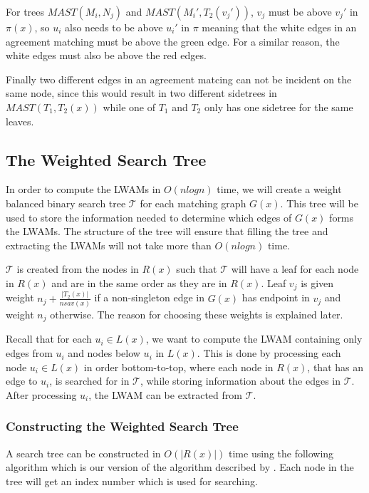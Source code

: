 For trees $MAST(M_i, N_j)$ and $MAST(M_i', T_2(v_j'))$, $v_j$ must be above $v_j'$ in $\pi(x)$, so $u_i$ also needs to be above $u_i'$ in $\pi$ meaning that the white edges in an agreement matching must be above the green edge. For a similar reason, the white edges must also be above the red edges.

Finally two different edges in an agreement matcing can not be incident on the same node, since this would result in two different sidetrees in $MAST(T_1, T_2(x))$ while one of $T_1$ and $T_2$ only has one sidetree for the same leaves.

\subsection{The Weighted Search Tree}
In order to compute the LWAMs in $O(nlogn)$ time, we will create a weight balanced binary search tree $\mathcal{T}$ for each matching graph $G(x)$. This tree will be used to store the information needed to determine which edges of $G(x)$ forms the LWAMs. The structure of the tree will ensure that filling the tree and extracting the LWAMs will not take more than $O(nlogn)$ time.

$\mathcal{T}$ is created from the nodes in $R(x)$ such that $\mathcal{T}$ will have a leaf for each node in $R(x)$ and are in the same order as they are in $R(x)$. Leaf $v_j$ is given weight $n_j + \frac{|T_2(x)|}{nsav(x)}$ if a non-singleton edge in $G(x)$ has endpoint in $v_j$ and weight $n_j$ otherwise. The reason for choosing these weights is explained later.

Recall that for each $u_i \in L(x)$, we want to compute the LWAM containing only edges from $u_i$ and nodes below $u_i$ in $L(x)$. This is done by processing each node $u_i \in L(x)$ in order bottom-to-top, where each node in $R(x)$, that has an edge to $u_i$, is searched for in $\mathcal{T}$, while storing information about the edges in $\mathcal{T}$.  After processing $u_i$, the LWAM can be extracted from $\mathcal{T}$. 

\subsubsection{Constructing the Weighted Search Tree}
A search tree can be constructed in $O(|R(x)|)$ time using the following algorithm which is our version of the algorithm described by . Each node in the tree will get an index number which is used for searching.

